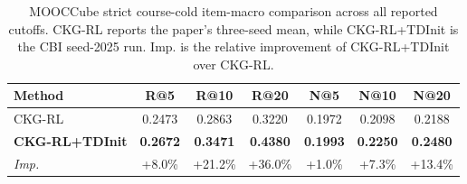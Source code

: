 \begin{table}[t]
\centering
{
\small
\setlength{\tabcolsep}{5.0pt}
\renewcommand{\arraystretch}{0.98}
\begin{tabular*}{\textwidth}{@{\extracolsep{\fill}}lcccccc}
\toprule
Method & R@5 & R@10 & R@20 & N@5 & N@10 & N@20 \\
\midrule
CKG-RL & 0.2473 & 0.2863 & 0.3220 & 0.1972 & 0.2098 & 0.2188 \\
\textbf{CKG-RL+TDInit} & \textbf{0.2672} & \textbf{0.3471} & \textbf{0.4380} & \textbf{0.1993} & \textbf{0.2250} & \textbf{0.2480} \\
\midrule
\emph{Imp.} & +8.0\% & +21.2\% & +36.0\% & +1.0\% & +7.3\% & +13.4\% \\
\bottomrule
\end{tabular*}
}
\caption{MOOCCube strict course-cold item-macro comparison across all reported cutoffs. CKG-RL reports the paper's three-seed mean, while CKG-RL+TDInit is the CBI seed-2025 run. Imp. is the relative improvement of CKG-RL+TDInit over CKG-RL.}
\label{tab:ckg-rl-tdinit-all-metrics}
\end{table}
